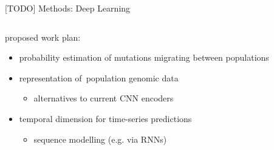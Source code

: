 \documentclass[final,hyperref={pdfpagelabels=false}]{beamer}
\begin{document}
\begin{frame}[t]
\begin{columns}[t]
\begin{column}{.465\textwidth}


\begin{block}{[TODO] Methods: Deep Learning}

\begin{columns} %
\begin{column}{.6\textwidth} %
proposed work plan:
\begin{itemize}
	\item probability estimation of mutations migrating between populations
	
	\item representation of~population genomic data
    \begin{itemize}
		 \item alternatives to current CNN encoders
    \end{itemize}
    
    \item temporal dimension for time-series predictions
    \begin{itemize}
		 \item sequence modelling (e.g. via RNNs)
    \end{itemize}
    
\end{itemize}
\end{column}

\begin{column}{.4\textwidth} %
\centering


\end{column}
\end{columns}
\end{block}
\end{column}
\end{columns}
\end{frame}
\end{document}
